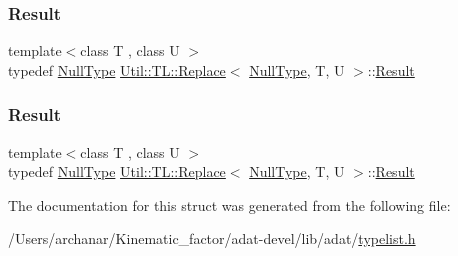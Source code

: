 \mbox{\label{structUtil_1_1TL_1_1Replace_3_01NullType_00_01T_00_01U_01_4_a28b43cf01f62dc72284927d673a7d228}} 
\subsubsection{\texorpdfstring{Result}{Result}\hspace{0.1cm}{\footnotesize\ttfamily [2/3]}}
{\footnotesize\ttfamily template$<$class T , class U $>$ \\
typedef \mbox{\hyperlink{classUtil_1_1NullType}{Null\+Type}} \mbox{\hyperlink{structUtil_1_1TL_1_1Replace}{Util\+::\+T\+L\+::\+Replace}}$<$ \mbox{\hyperlink{classUtil_1_1NullType}{Null\+Type}}, T, U $>$\+::\mbox{\hyperlink{structUtil_1_1TL_1_1Replace_3_01NullType_00_01T_00_01U_01_4_a28b43cf01f62dc72284927d673a7d228}{Result}}}

\mbox{\label{structUtil_1_1TL_1_1Replace_3_01NullType_00_01T_00_01U_01_4_a28b43cf01f62dc72284927d673a7d228}} 
\subsubsection{\texorpdfstring{Result}{Result}\hspace{0.1cm}{\footnotesize\ttfamily [3/3]}}
{\footnotesize\ttfamily template$<$class T , class U $>$ \\
typedef \mbox{\hyperlink{classUtil_1_1NullType}{Null\+Type}} \mbox{\hyperlink{structUtil_1_1TL_1_1Replace}{Util\+::\+T\+L\+::\+Replace}}$<$ \mbox{\hyperlink{classUtil_1_1NullType}{Null\+Type}}, T, U $>$\+::\mbox{\hyperlink{structUtil_1_1TL_1_1Replace_3_01NullType_00_01T_00_01U_01_4_a28b43cf01f62dc72284927d673a7d228}{Result}}}



The documentation for this struct was generated from the following file\+:\begin{DoxyCompactItemize}
\item 
/\+Users/archanar/\+Kinematic\+\_\+factor/adat-\/devel/lib/adat/\mbox{\hyperlink{adat-devel_2lib_2adat_2typelist_8h}{typelist.\+h}}\end{DoxyCompactItemize}
